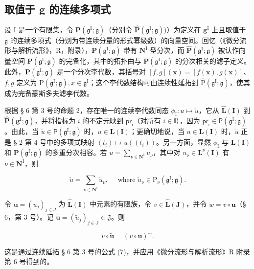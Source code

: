 \subsection{取值于 g 的连续多项式}

设 I 是一个有限集，令 \(\mathbf{P}(\mathfrak{g}^{\mathrm{I}};\mathfrak{g})\)（分别令 \(\hat{\mathbf{P}} (\mathfrak{g}^{\mathrm{I}};\mathfrak{g}))\)）为定义在 \(\mathbf{g}^{\mathrm{I}}\) 上且取值于 \(\mathfrak{g}\) 的连续多项式（分别为带连续分量的形式幂级数）的向量空间。回忆（《微分流形与解析流形》，R，附录），\(\mathbf{P}(\mathfrak{g}^{\mathrm{I}};\mathfrak{g})\) 带有 \(\mathbf{N}^{\mathrm{I}}\) 型分次，而 \(\hat{\mathbf{P}} (\mathfrak{g}^{\mathrm{I}};\mathfrak{g})\) 被认作向量空间 \(\mathbf{P} (\mathfrak{g}^{\mathrm{I}};\mathfrak{g})\) 的完备化，其中的拓扑由与 \(\mathbf{P}(\mathfrak{g}^{\mathrm{I}};\mathfrak{g})\) 的分次相关的滤子定义。此外，\(\mathbf{P}(\mathfrak{g}^{\mathrm{I}};\mathfrak{g})\) 是一个分次李代数，其括号对 \([f,g](\pmb {x}) = [f(\pmb {x}),g(\pmb {x})]\)、\(f, g\) 定义为 \(\mathrm{P}(\mathfrak{g}^{\mathrm{I}}; \mathfrak{g}), x \in \mathfrak{g}^{\mathrm{I}}\)；这个李代数结构可由连续性延拓到 \(\hat{\mathrm{P}}(\mathfrak{g}^{\mathrm{I}}; \mathfrak{g})\)，使其成为完备豪斯多夫滤李代数。

根据 § 6 第 3 号的命题 2，存在唯一的连续李代数同态 \(\phi_{\mathrm{I}}:u\mapsto \tilde{u}\)，它从 \(\hat{\mathbf{L}} (\mathbf{I})\) 到 \(\hat{\mathbf{P}} (\mathbf{g}^{\mathrm{I}};\mathfrak{g})\)，并将指标为 \(i\) 的不定元映到 \(\mathsf{pr}_{\mathrm{i}}\)（对所有 \(i\in \mathbb{I}\)），因为 \(\mathsf{pr}_{\mathrm{i}}\in \mathsf{P}(\mathfrak{g}^{\mathrm{I}};\mathfrak{g})\)。由此，当 \(\tilde{u}\in \mathsf{P}(\mathfrak{g}^{\mathrm{I}};\mathfrak{g})\) 时，\(u\in \mathbf{L}(\mathbf{I})\)；更确切地说，当 \(u\in \mathbf{L}(\mathbf{I})\) 时，\(\tilde{u}\) 正是 § 2 第 4 号中的多项式映射 \((t_i)\mapsto u((t_i))\)。另一方面，显然 \(\phi_{\mathrm{I}}\) 与 \(\mathbf{L}(\mathbf{I})\) 和 \(\mathbf{P}(\mathfrak{g}^{\mathrm{I}};\mathfrak{g})\) 的多重分次相容。若 \(u = \sum_{\nu \in \mathbf{N}^{\mathrm{I}}}u_{\nu}\)，其中对 \(u_{\nu}\in \mathbf{L}^{\nu}(\mathbf{I})\) 有 \(\nu \in \mathbf{N}^{\mathrm{I}}\)，则

\[
\tilde {u} = \sum_ {\nu \in \mathbf {N} ^ {\mathrm{I}}}  \tilde {u} _ {\nu}, \quad \text { where } \tilde {u} _ {\nu} \in \mathrm{P} _ {\nu} (\mathfrak {g} ^ {\mathrm{I}}; \mathfrak {g}).
\]

令 \(\pmb{u} = (u_j)_{j\in J}\) 为 \(\hat{\mathbf{L}} (\mathbf{I})\) 中元素的有限族，令 \(v\in \hat{\mathbf{L}} (\mathbf{J})\)，并令 \(w = v\circ \pmb {u}\)（§ 6，第 3 号）。记 \(\tilde{\pmb{u}} = (\tilde{u}_j)_{j\in \mathbb{J}}\in \mathfrak{J}\)。则

\[
\tilde {v} \circ \tilde {\boldsymbol {u}} = (v \circ \boldsymbol {u}) ^ {\sim}.\tag{2}
\]

这是通过连续延拓 § 6 第 3 号的公式 (7)，并应用《微分流形与解析流形》R 附录第 6 号得到的。

